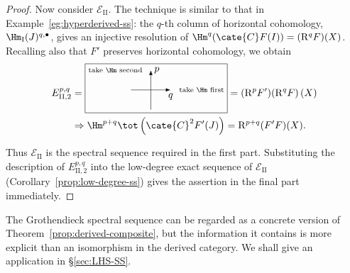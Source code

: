 \begin{proof}
	Now consider $\mathscr{E}_{\mathrm{II}}$. The technique is similar to that
	in Example~\ref{eg:hyperderived-ss}: the $q$-th column of horizontal
	cohomology, $\Hm_{\mathrm{I}}(J)^{q,\bullet}$, gives an injective resolution
	of $\Hm^q(\cate{C}F(I))=(\mathrm{R}^qF)(X)$. Recalling also that $F'$
	preserves horizontal cohomology, we obtain
	\begin{align*}
		E_{\mathrm{II},2}^{p, q} & =
		\begin{tikzpicture}[scale=0.7, baseline=(O)]
			\draw[-Latex] (0, -1) -- (0, 1) node[right] {$p$} node[left=0.5em] {\scriptsize\text{take $\Hm$ second}};
			\draw[-Latex] (-1, 0) -- (1, 0) node[below] {$q$} node[right=0.5em] {\scriptsize\text{take $\Hm$ first}};
			\coordinate (O) at (0, -0.3);
			\draw (current bounding box.north west) rectangle ([yshift=-1ex] current bounding box.south east);
		\end{tikzpicture}
		= (\mathrm{R}^p F')(\mathrm{R}^q F)\left( X \right) \\
		& \Rightarrow \Hm^{p+q}\tot\left(\cate{C}^2 F'(J)\right) = \mathrm{R}^{p+q}(F'F)(X).
	\end{align*}

	Thus $\mathscr{E}_{\mathrm{II}}$ is the spectral sequence required in the
	first part. Substituting the description of
	$E_{\mathrm{II},2}^{p,q}$ into the low-degree exact sequence of
	$\mathscr{E}_{\mathrm{II}}$ (Corollary~\ref{prop:low-degree-ss}) gives the
	assertion in the final part immediately.
\end{proof}

The Grothendieck spectral sequence can be regarded as a concrete version of
Theorem~\ref{prop:derived-composite}, but the information it contains is more
explicit than an isomorphism in the derived category. We shall give an
application in \S\ref{sec:LHS-SS}.

